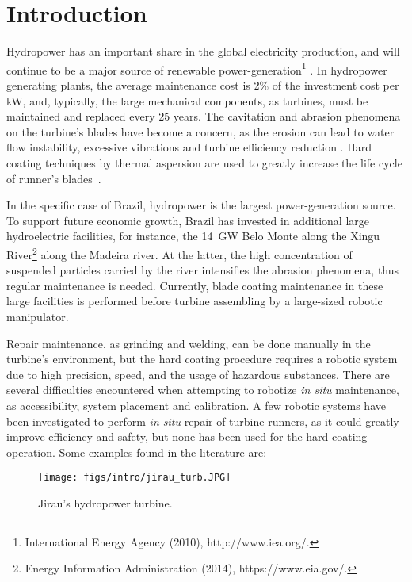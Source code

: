 \section{Introduction}

Hydropower has an important share in the global electricity production, and
will continue to be a major source of renewable
power-generation\footnote{International Energy Agency (2010), http://www.iea.org/.}%
. In hydropower generating plants, the average maintenance cost is 2\% of the
investment cost per kW, and, typically, the large mechanical
components, as turbines, must be maintained and replaced every 25 years.
The cavitation and abrasion phenomena on the turbine's blades have become a
concern, as the erosion can lead to water flow instability, excessive
vibrations and turbine efficiency reduction \cite{goldemberg2007energia}. Hard
coating techniques by thermal aspersion are used to greatly increase the life
cycle of runner's blades~\cite{krella2011new}.

In the specific case of Brazil, hydropower is the largest power-generation
source. To support future economic growth, Brazil has invested in additional
large hydroelectric facilities, for instance, the 14~GW Belo Monte along the
Xingu River\footnote{Energy Information Administration (2014),
https://www.eia.gov/.}%
along the Madeira river. At the latter, the high concentration of suspended
particles carried by the river intensifies the abrasion phenomena, thus regular
maintenance is needed. Currently, blade coating maintenance in these large
facilities is performed before turbine assembling by a large-sized robotic
manipulator.

Repair maintenance, as grinding and welding, can be done manually in the
turbine's environment, but the hard coating procedure requires a robotic system
due to high precision, speed, and the usage of hazardous substances.
There are several difficulties encountered when attempting to robotize
\textit{in situ} maintenance, as accessibility, system placement and
calibration. A few robotic systems have been investigated to perform \textit{in
situ} repair of turbine runners, as it could greatly improve efficiency and
safety, but none has been used for the hard coating operation. Some examples
found in the literature are:

\begin{figure}[h!]
\centering
	\texttt{[image: figs/intro/jirau\_turb.JPG]} 
	\caption{Jirau's hydropower turbine.}
	\label{fig::jirau_turb}
\end{figure}

